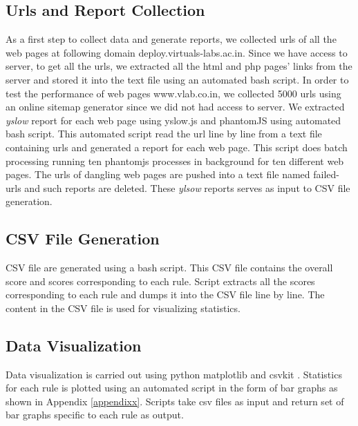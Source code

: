 \documentclass[conference]{IEEEtran}
\begin{document}
\subsection{Urls and Report Collection}\label{sec-4.1}
As a first step to collect data and generate reports, we
collected urls of all the web pages at following domain deploy.virtuals-labs.ac.in.
Since we have access to server, to get all the urls, we extracted
all the html and php pages' links from the server and stored it into the text file
using an automated bash script.
In order to test the performance of web pages www.vlab.co.in, we collected 5000 urls
using an online sitemap generator since we did not had access to server.
We extracted {\it yslow} report for each web page using yslow.js and phantomJS using automated bash
script. This automated script read the url line by line from a text file containing
urls and generated a report for each web page. This script does batch processing running
ten phantomjs processes in background for ten different web pages. The urls of dangling web pages 
are pushed into a text file named failed-urls and such reports are deleted.
These {\it ylsow} reports serves as input to CSV file generation.

\subsection{CSV File Generation}\label{sec-4.2}
CSV file are generated using a bash script. This CSV file contains the overall
score and scores corresponding to each rule. Script extracts all the scores
corresponding to each rule and dumps it into the CSV file line by line. The
content in the CSV file is used for visualizing statistics.

\subsection{Data Visualization}\label{sec-4.3}
Data visualization is carried out using python matplotlib \cite{matplot} and csvkit \cite{csvkit}. 
Statistics for each rule is plotted using an automated
script in the form of bar graphs as shown in Appendix \ref{appendixx}. Scripts take csv files as input
and return set of bar graphs specific to each rule as output.
\end{document}
